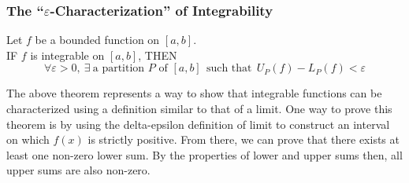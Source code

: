 \documentclass[10pt]{article}
\newenvironment{theorem}[1][]{\begin{tcolorbox}[colframe=_blue,colback=_blue2,title=Theorem. \ifthenelse{\isempty{#1}}{}{(#1)}
]}{\end{tcolorbox}}
\begin{document}
\subsubsection{The ``$\varepsilon$-Characterization'' of Integrability}
\begin{theorem}
    Let $f$ be a bounded function on $[a,b]$. \\
    IF $f$ is integrable on $[a,b]$,
    THEN
    $$
        \forall \varepsilon>0,~\exists~\text{a partition $P$ of $[a,b]$}~~\text{such that}~~U_P(f)-L_P(f)<\varepsilon
    $$
\end{theorem}
The above theorem represents a way to show that integrable functions can be characterized using a definition similar to that of a limit. One way to prove this theorem is by using the delta-epsilon definition of limit to construct an interval on which $f(x)$ is strictly positive. From there, we can prove that there exists at least one non-zero lower sum. By the properties of lower and upper sums then, all upper sums are also non-zero.
\newpage
\end{document}
